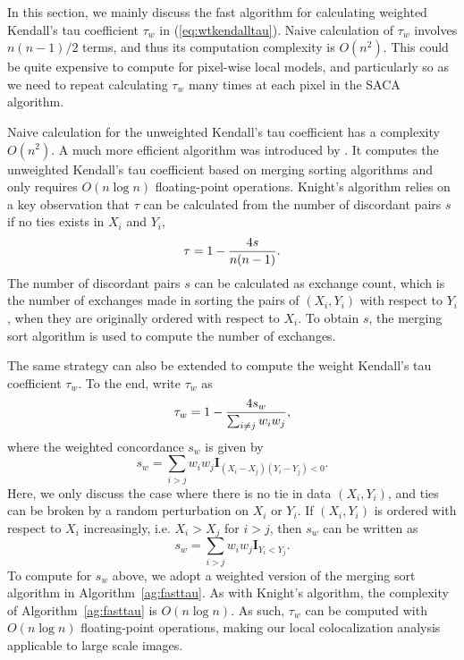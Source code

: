 \documentclass[10pt,twocolumn,twoside]{IEEEtran}
\begin{document}
In this section, we mainly discuss the fast algorithm for calculating weighted Kendall's tau coefficient $\tau_w$ in (\ref{eq:wtkendalltau}). Naive calculation of $\tau_w$ involves $n(n-1)/2$ terms, and thus its computation complexity is $O(n^2)$. This could be quite expensive to compute for pixel-wise local models, and particularly so as we need to repeat calculating $\tau_w$ many times at each pixel in the SACA algorithm.

Naive calculation for the unweighted Kendall's tau coefficient has a complexity $O(n^2)$. A much more efficient algorithm was introduced by \cite{knight1966}. It computes the unweighted Kendall's tau coefficient based on merging sorting algorithms and only requires $O(n\log n)$ floating-point operations. Knight's algorithm relies on a key observation that $\tau$ can be calculated from the number of discordant pairs $s$ if no ties exists in $X_i$ and $Y_i$,
$$
\tau=1-{4s\over n(n-1)}.
$$
The number of discordant pairs $s$ can be calculated as exchange count, which is the number of exchanges made in sorting the pairs of $(X_i,Y_i)$ with respect to $Y_i$, when they are originally ordered with respect to $X_i$. To obtain $s$, the merging sort algorithm is used to compute the number of exchanges.

The same strategy can also be extended to compute the weight Kendall's tau coefficient $\tau_w$. To the end, write $\tau_w$ as
$$
\tau_w=1-{4s_w\over \sum_{i\ne j}w_iw_j},
$$
where the weighted concordance $s_w$ is given by 
$$
s_w=\sum_{i>j}w_iw_j \mathbf{I}_{(X_i-X_j)(Y_i-Y_j)<0}.
$$
Here, we only discuss the case where there is no tie in data $(X_i, Y_i)$, and ties can be broken by a random perturbation on $X_i$ or $Y_i$. If $(X_i,Y_i)$ is ordered with respect to $X_i$ increasingly, i.e. $X_i>X_j$ for $i>j$, then $s_w$ can be written as
$$
s_w=\sum_{i>j}w_iw_j \mathbf{I}_{Y_i<Y_j}.
$$
To compute for $s_w$ above, we adopt a weighted version of the merging sort algorithm in Algorithm~\ref{ag:fasttau}. As with Knight's algorithm, the complexity of Algorithm~\ref{ag:fasttau} is $O(n\log n)$. As such, $\tau_w$ can be computed with $O(n\log n)$ floating-point operations, making our local colocalization analysis applicable to large scale images.
\end{document}
